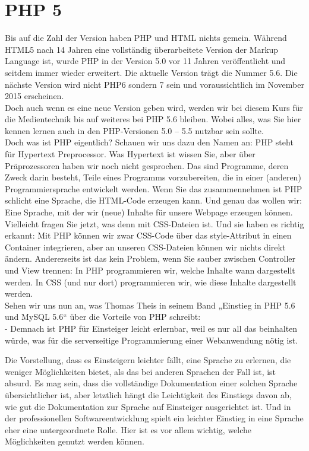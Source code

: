 \section{PHP 5}

Bis auf die Zahl der Version haben PHP und HTML nichts gemein. Während HTML5 nach 14 Jahren eine vollständig überarbeitete Version der Markup Language ist, wurde PHP in der Version 5.0 vor 11 Jahren veröffentlicht und seitdem immer wieder erweitert. Die aktuelle Version trägt die Nummer 5.6. Die nächste Version wird nicht PHP6 sondern 7 sein und voraussichtlich im November 2015 erscheinen.\\


Doch auch wenn es eine neue Version geben wird, werden wir bei diesem Kurs für die Medientechnik bis auf weiteres bei PHP 5.6 bleiben. Wobei alles, was Sie hier kennen lernen auch in den PHP-Versionen 5.0 – 5.5 nutzbar sein sollte.\\


Doch was ist PHP eigentlich? Schauen wir uns dazu den Namen an: PHP steht für Hypertext Preprocessor. Was Hypertext ist wissen Sie, aber über Präprozessoren haben wir noch nicht gesprochen. Das sind Programme, deren Zweck darin besteht, Teile eines Programms vorzubereiten, die in einer (anderen) Programmiersprache entwickelt werden. Wenn Sie das zusammennehmen ist PHP schlicht eine Sprache, die HTML-Code erzeugen kann. Und genau das wollen wir: Eine Sprache, mit der wir (neue) Inhalte für unsere Webpage erzeugen können.\\


Vielleicht fragen Sie jetzt, was denn mit CSS-Dateien ist. Und sie haben es richtig erkannt: Mit PHP können wir zwar CSS-Code über das style-Attribut in einen Container integrieren, aber an unseren CSS-Dateien können wir nichts direkt ändern. Andererseits ist das kein Problem, wenn Sie sauber zwischen Controller und View trennen: In PHP programmieren wir, welche Inhalte wann dargestellt werden. In CSS (und nur dort) programmieren wir, wie diese Inhalte dargestellt werden.\\


Sehen wir uns nun an, was Thomas Theis in seinem Band „Einstieg in PHP 5.6 und MySQL 5.6“ über die Vorteile von PHP schreibt:\\


-	Demnach ist PHP für Einsteiger leicht erlernbar, weil es nur all das beinhalten würde, was für die serverseitige Programmierung einer Webanwendung nötig ist.

Die Vorstellung, dass es Einsteigern leichter fällt, eine Sprache zu erlernen, die weniger Möglichkeiten bietet, als das bei anderen Sprachen der Fall ist, ist absurd. Es mag sein, dass die vollständige Dokumentation einer solchen Sprache übersichtlicher ist, aber letztlich hängt die Leichtigkeit des Einstiegs davon ab, wie gut die Dokumentation zur Sprache auf Einsteiger ausgerichtet ist. Und in der professionellen Softwareentwicklung spielt ein leichter Einstieg in eine Sprache eher eine untergeordnete Rolle. Hier ist es vor allem wichtig, welche Möglichkeiten genutzt werden können. \\


